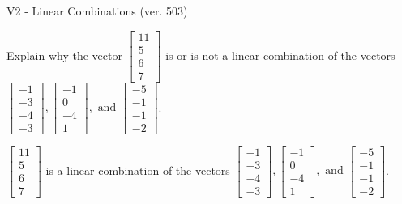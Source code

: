 \begin{exercise}
  \begin{exerciseTitle}V2 - Linear Combinations (ver. 503)\end{exerciseTitle}
  \begin{exerciseStatement}
    Explain why the vector \(\left[\begin{array}{c}
11 \\
5 \\
6 \\
7
\end{array}\right]\)  is or is not a linear 
	combination of the vectors \(\left[\begin{array}{c}
-1 \\
-3 \\
-4 \\
-3
\end{array}\right] , \left[\begin{array}{c}
-1 \\
0 \\
-4 \\
1
\end{array}\right] , \text{ and } \left[\begin{array}{c}
-5 \\
-1 \\
-1 \\
-2
\end{array}\right]\).
	


  \end{exerciseStatement}
  \begin{exerciseAnswer}
   \(\left[\begin{array}{c}
11 \\
5 \\
6 \\
7
\end{array}\right]\) 
  	 is  
	a linear combination of the vectors \(\left[\begin{array}{c}
-1 \\
-3 \\
-4 \\
-3
\end{array}\right] , \left[\begin{array}{c}
-1 \\
0 \\
-4 \\
1
\end{array}\right] , \text{ and } \left[\begin{array}{c}
-5 \\
-1 \\
-1 \\
-2
\end{array}\right]\).

	
  


  \end{exerciseAnswer}
\end{exercise}
